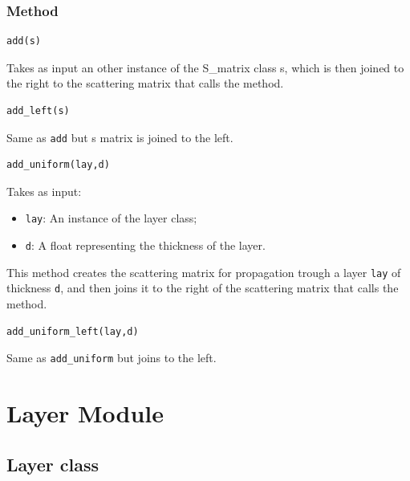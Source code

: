 \documentclass[a4paper,10pt]{report}
\begin{document}
\subsubsection{Method}
\begin{lstlisting}[language=Python,basicstyle=\ttfamily\Large]
add(s)
\end{lstlisting}
Takes as input an other instance of the S\_matrix class s, which is then joined to the right to the scattering matrix that calls the method.

\begin{lstlisting}[language=Python,basicstyle=\ttfamily\Large]
add_left(s)
\end{lstlisting}
Same as \texttt{add} but s matrix is joined to the left.

\begin{lstlisting}[language=Python,basicstyle=\ttfamily\Large]
add_uniform(lay,d)
\end{lstlisting}
Takes as input:
\begin{itemize}[noitemsep,topsep=0pt,parsep=0pt,partopsep=0pt]
\item \texttt{lay}: An instance of the layer class;
\item \texttt{d}: A float representing the thickness of the layer.
\end{itemize}
This method creates the scattering matrix for propagation trough a layer \texttt{lay} of thickness \texttt{d}, and then joins it to the right of the scattering matrix that calls the method.

\begin{lstlisting}[language=Python,basicstyle=\ttfamily\Large]
add_uniform_left(lay,d)
\end{lstlisting}
Same as \texttt{add\_uniform} but joins to the left.





\section{Layer Module}
\subsection{Layer class}
\end{document}
